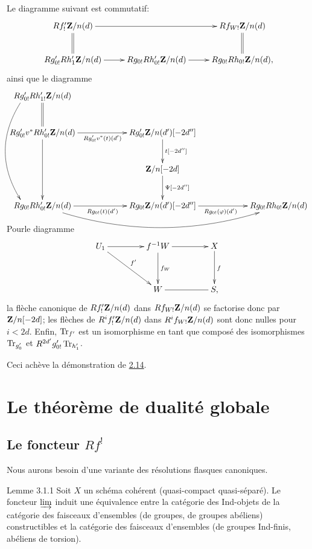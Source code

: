 \documentclass[10pt]{../fichiers-configuration-latex/smfart}
\begin{document}
Le diagramme suivant est commutatif:
$$
\xymatrix{
  Rf'_{!}\ZZ/n(d) \ar[rr]\ar@{=}[d] & & Rf_{W!}\ZZ/n(d) \ar@{=}[d]\\
Rg'_{0!} Rh'_1\ZZ/n(d) \ar[r]& Rg_{0!} Rh'_{0!}\ZZ/n(d) \ar[r]& Rg_{0!}
Rh_{0!}\ZZ/n(d), 
}
$$
ainsi que le diagramme
$$
\xymatrix@C=2.1cm@R=1cm{
  Rg'_{0!} Rh'_{1!} \ZZ/n(d)   \ar@{=}[d] \ar@<-5ex>@/_2pc/[ddd]& &\\
Rg'_{0!} v^{\ast} Rh'_{0!} \ZZ/n(d)
 \ar[dd] \ar[r]_{Rg'_{0!}v^{\ast}(t)(d')}& 
Rg'_{0!}\ZZ/n(d')[-2d''] \ar[d]^{t[-2d'']}& \\
   & \ZZ/n[-2d] \ar[d]^{\Psi[-2d'']}\\
Rg_{0!} Rh'_{0!} \ZZ/n(d) \ar[r]_{Rg_{0!}(t)(d')} \ar@/_2.2pc/[rr]& Rg_{0!}\ZZ/n(d')[-2d''] \ar[r]_{Rg_{0!}(\varphi)(d')}& Rg_{0!}Rh_{0!}\ZZ/n(d)
}
$$
Pour\pageoriginale le diagramme
$$
\xymatrix@C=1.5cm@R=1.25cm{
U_1 \ar[r]\ar[rd]^{f'} & f^{-1}W \ar[r]\ar[d]^{f_W}& X\ar[d]^{f}\\
                       &  W \ar@{-}[r]     & S,
}
$$
la flèche canonique de $Rf'_{!}\mathbf{Z}/n(d)$ dans
$Rf_{W!}\mathbf{Z}/n(d)$ se factorise donc par $\mathbf{Z}/n[-2d]$; les
flèches de $R^{i}f'_{!}\mathbf{Z}/n(d)$ dans
$R^{i}f_{W!}\mathbf{Z}/n(d)$ sont donc nulles pour $i<2d$. Enfin,
$\operatorname{Tr}_{f'}$ est un isomorphisme en tant que composé des isomorphismes
$\operatorname{Tr}_{g'_{0}}$ et $R^{2d'}g'_{0!}\operatorname{Tr}_{h'_{1}}$.

Ceci achève la démonstration de \hyperref[XVIII.thm2.14]{2.14}.

\section{Le théorème de dualité globale}\pageoriginale 

\subsection{Le foncteur $Rf^{!}$}

Nous aurons besoin d'une variante des résolutions flasques canoniques.

\begin{enonce*}{Lemme 3.1.1}
Soit $X$ un schéma cohérent (\ie quasi-compact quasi-séparé). Le
foncteur $\varinjlim$ induit une équivalence entre la catégorie des
Ind-objets de la catégorie des faisceaux d'ensembles (\resp de
groupes, \resp de groupes abéliens) constructibles et la catégorie des
faisceaux d'ensembles (\resp de groupes Ind-finis, \resp abéliens de torsion).
\end{enonce*}
\end{document}
